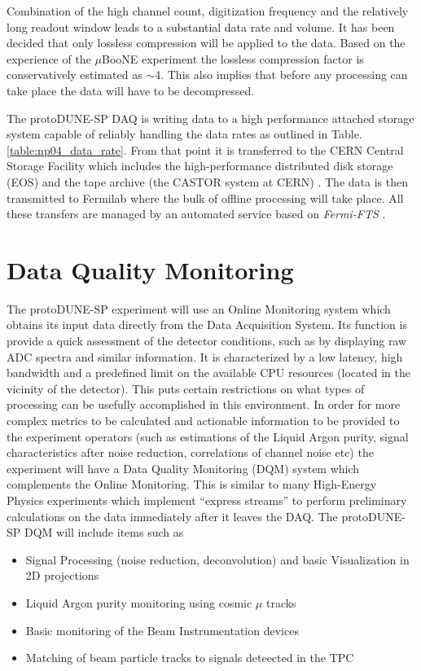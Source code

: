 \documentclass{PoS}
\newcommand{\pd}{protoDUNE\xspace}
\begin{document}
Combination of the high channel count,
digitization frequency
and the relatively long readout window leads to a substantial data rate and volume. It has been decided that only
lossless compression will be applied to the data. Based on the experience of the $\mu$BooNE experiment \cite{uboone}
the lossless compression factor is conservatively estimated as $\sim$4. This also implies that before any processing can
take place the data will have to be decompressed.

The \pd-SP DAQ is writing data to a high performance attached storage system capable of reliably handling the data
rates as outlined in Table.\,\ref{table:np04_data_rate}. From that point it is transferred to the CERN Central Storage
Facility which includes the high-performance distributed disk storage (EOS) and the tape archive (the CASTOR
system at CERN) \cite{castoreos}. The data is then transmitted to Fermilab where the bulk of offline processing
will take place.
All these transfers are managed by an automated service based on \textit{Fermi-FTS} \cite{sam,fts}.

\section{Data Quality Monitoring}
The protoDUNE-SP experiment will use an Online Monitoring system which obtains its input data directly
from the Data Acquisition System. Its function is provide a quick assessment of the detector conditions, such
as by displaying raw ADC spectra and similar information. It is characterized by a  low latency, high bandwidth
and a predefined limit on the available CPU resources (located in the vicinity of the detector). This
puts certain restrictions on what types of processing can be usefully accomplished in this environment.
In order for more complex metrics to be calculated and actionable information to be provided to the experiment operators
(such as estimations of the Liquid Argon purity, signal characteristics after noise reduction, correlations of channel noise etc) 
the experiment will have a Data Quality Monitoring (DQM) system which complements the Online Monitoring.
This is similar to many High-Energy Physics experiments which implement ``express streams'' to perform
preliminary calculations on the data immediately after it leaves the DAQ.
The \pd-SP DQM will include items such as
\begin{itemize}
\item Signal Processing (noise reduction, deconvolution) and basic Visualization in 2D projections
\item Liquid Argon purity monitoring using cosmic $\mu$ tracks
\item Basic monitoring of the Beam Instrumentation devices
\item Matching of beam particle tracks to signals deteected in the TPC
\end{itemize}
\end{document}
